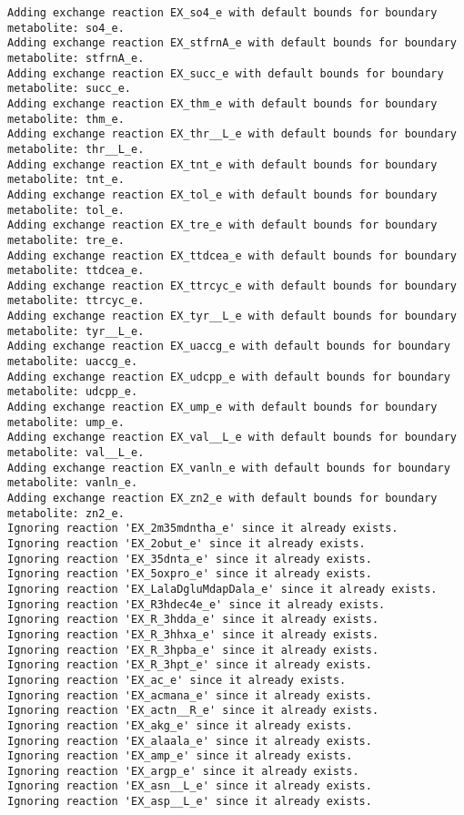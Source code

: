 \documentclass[
  letterpaper,
  DIV=11,
  numbers=noendperiod]{scrartcl}
\begin{document}
\begin{verbatim}
Adding exchange reaction EX_so4_e with default bounds for boundary metabolite: so4_e.
Adding exchange reaction EX_stfrnA_e with default bounds for boundary metabolite: stfrnA_e.
Adding exchange reaction EX_succ_e with default bounds for boundary metabolite: succ_e.
Adding exchange reaction EX_thm_e with default bounds for boundary metabolite: thm_e.
Adding exchange reaction EX_thr__L_e with default bounds for boundary metabolite: thr__L_e.
Adding exchange reaction EX_tnt_e with default bounds for boundary metabolite: tnt_e.
Adding exchange reaction EX_tol_e with default bounds for boundary metabolite: tol_e.
Adding exchange reaction EX_tre_e with default bounds for boundary metabolite: tre_e.
Adding exchange reaction EX_ttdcea_e with default bounds for boundary metabolite: ttdcea_e.
Adding exchange reaction EX_ttrcyc_e with default bounds for boundary metabolite: ttrcyc_e.
Adding exchange reaction EX_tyr__L_e with default bounds for boundary metabolite: tyr__L_e.
Adding exchange reaction EX_uaccg_e with default bounds for boundary metabolite: uaccg_e.
Adding exchange reaction EX_udcpp_e with default bounds for boundary metabolite: udcpp_e.
Adding exchange reaction EX_ump_e with default bounds for boundary metabolite: ump_e.
Adding exchange reaction EX_val__L_e with default bounds for boundary metabolite: val__L_e.
Adding exchange reaction EX_vanln_e with default bounds for boundary metabolite: vanln_e.
Adding exchange reaction EX_zn2_e with default bounds for boundary metabolite: zn2_e.
Ignoring reaction 'EX_2m35mdntha_e' since it already exists.
Ignoring reaction 'EX_2obut_e' since it already exists.
Ignoring reaction 'EX_35dnta_e' since it already exists.
Ignoring reaction 'EX_5oxpro_e' since it already exists.
Ignoring reaction 'EX_LalaDgluMdapDala_e' since it already exists.
Ignoring reaction 'EX_R3hdec4e_e' since it already exists.
Ignoring reaction 'EX_R_3hdda_e' since it already exists.
Ignoring reaction 'EX_R_3hhxa_e' since it already exists.
Ignoring reaction 'EX_R_3hpba_e' since it already exists.
Ignoring reaction 'EX_R_3hpt_e' since it already exists.
Ignoring reaction 'EX_ac_e' since it already exists.
Ignoring reaction 'EX_acmana_e' since it already exists.
Ignoring reaction 'EX_actn__R_e' since it already exists.
Ignoring reaction 'EX_akg_e' since it already exists.
Ignoring reaction 'EX_alaala_e' since it already exists.
Ignoring reaction 'EX_amp_e' since it already exists.
Ignoring reaction 'EX_argp_e' since it already exists.
Ignoring reaction 'EX_asn__L_e' since it already exists.
Ignoring reaction 'EX_asp__L_e' since it already exists.

\end{verbatim}
\end{document}
